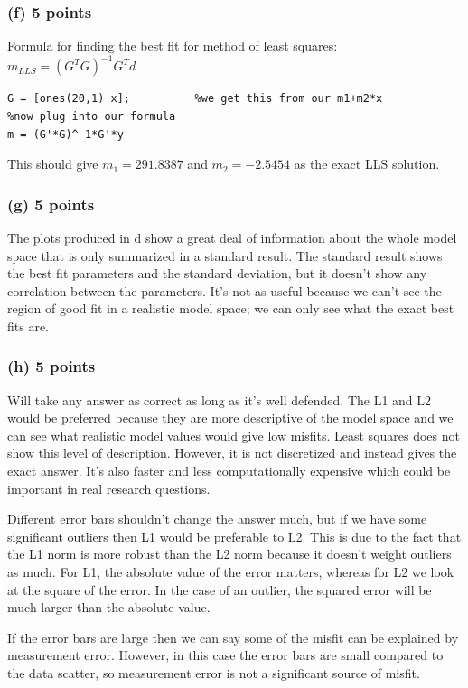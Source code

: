 \documentclass[11pt]{article}
\begin{document}
\subsubsection*{(f) 5 points}
Formula for finding the best fit for method of least squares:
$m_{LLS} = (G^{T}G)^{-1}G^{T}d$

\begin{verbatim}
G = [ones(20,1) x];          %we get this from our m1+m2*x
%now plug into our formula
m = (G'*G)^-1*G'*y
\end{verbatim}

This should give $m_1 = 291.8387$ and $m_2 = -2.5454$ as the exact LLS solution.

\subsubsection*{(g) 5 points}
The plots produced in d show a great deal of information about the whole
model space that is only summarized in a standard result.  The standard
result shows the best fit parameters and the standard deviation, but it
doesn't show any correlation between the parameters.  It's not as useful
because we can't see the region of good fit in a realistic model space; we
can only see what the exact best fits are.

\subsubsection*{(h) 5 points}
Will take any answer as correct as long as it's well defended.  The L1 and
L2 would be preferred because they are more descriptive of the model space
and we can see what realistic model values would give low misfits.  Least
squares does not show this level of description.  However, it is not
discretized and instead gives the exact answer.  It's also faster and less
computationally expensive which could be important in real research
questions.

Different error bars shouldn't change the answer much, but if we have some
significant outliers then L1 would be preferable to L2.  This is due to the fact that the L1 norm is more robust than the L2 norm because it doesn't weight outliers as much.  For L1, the absolute value of the error matters, whereas for L2 we look at the square of the error.  In the case of an outlier, the squared error will be much larger than the absolute value.

If the error bars are large then we can say some of
the misfit can be explained by measurement error.  However, in this case
the error bars are small compared to the data scatter, so measurement
error is not a significant source of misfit.
\end{document}
